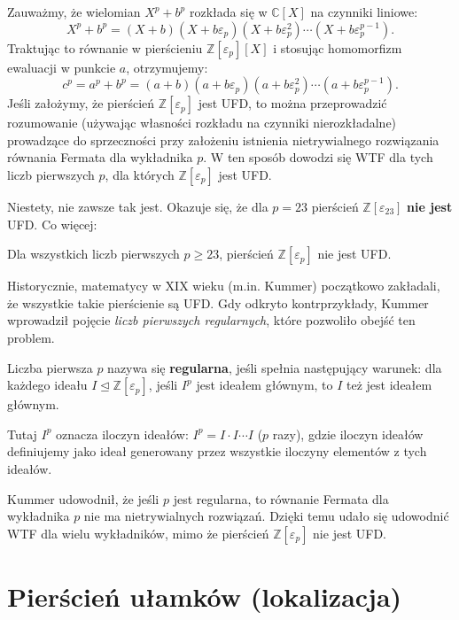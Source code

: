 Zauważmy, że wielomian $X^p + b^p$ rozkłada się w $\mathbb{C}[X]$ na czynniki liniowe:
\[
X^p + b^p = (X + b)(X + b\varepsilon_p)(X + b\varepsilon_p^2) \cdots (X + b\varepsilon_p^{p-1}).
\]
Traktując to równanie w pierścieniu $\mathbb{Z}[\varepsilon_p][X]$ i stosując homomorfizm ewaluacji w punkcie $a$, otrzymujemy:
\[
c^p = a^p + b^p = (a + b)(a + b\varepsilon_p)(a + b\varepsilon_p^2) \cdots (a + b\varepsilon_p^{p-1}).
\]
Jeśli założymy, że pierścień $\mathbb{Z}[\varepsilon_p]$ jest UFD, to można przeprowadzić rozumowanie (używając własności rozkładu na czynniki nierozkładalne) prowadzące do sprzeczności przy założeniu istnienia nietrywialnego rozwiązania równania Fermata dla wykładnika $p$. W ten sposób dowodzi się WTF dla tych liczb pierwszych $p$, dla których $\mathbb{Z}[\varepsilon_p]$ jest UFD.

Niestety, nie zawsze tak jest. Okazuje się, że dla $p=23$ pierścień $\mathbb{Z}[\varepsilon_{23}]$ \textbf{nie jest} UFD. Co więcej:

\begin{fact}
Dla wszystkich liczb pierwszych $p \geq 23$, pierścień $\mathbb{Z}[\varepsilon_p]$ nie jest UFD.
\end{fact}

Historycznie, matematycy w XIX wieku (m.in. Kummer) początkowo zakładali, że wszystkie takie pierścienie są UFD. Gdy odkryto kontrprzykłady, Kummer wprowadził pojęcie \emph{liczb pierwszych regularnych}, które pozwoliło obejść ten problem.

\begin{definition}
Liczba pierwsza $p$ nazywa się \textbf{regularna}, jeśli spełnia następujący warunek: dla każdego ideału $I \trianglelefteq \mathbb{Z}[\varepsilon_p]$, jeśli $I^p$ jest ideałem głównym, to $I$ też jest ideałem głównym.

Tutaj $I^p$ oznacza iloczyn ideałów: $I^p = I \cdot I \cdots I$ ($p$ razy), gdzie iloczyn ideałów definiujemy jako ideał generowany przez wszystkie iloczyny elementów z tych ideałów.
\end{definition}

Kummer udowodnił, że jeśli $p$ jest regularna, to równanie Fermata dla wykładnika $p$ nie ma nietrywialnych rozwiązań. Dzięki temu udało się udowodnić WTF dla wielu wykładników, mimo że pierścień $\mathbb{Z}[\varepsilon_p]$ nie jest UFD.

\section{Pierścień ułamków (lokalizacja)}

